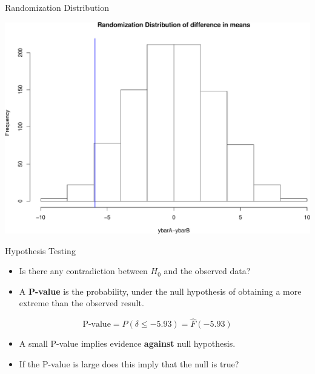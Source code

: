 \documentclass[9pt,ignorenonframetext,]{beamer}
\providecommand{\tightlist}{%
\setlength{\itemsep}{0pt}\setlength{\parskip}{0pt}}
\begin{document}
\begin{frame}{Randomization Distribution}

\includegraphics{class4slides-jan18_files/figure-beamer/unnamed-chunk-7-1.pdf}

\end{frame}

\begin{frame}{Hypothesis Testing}

\begin{itemize}
\tightlist
\item
  Is there any contradiction between \(H_0\) and the observed data?
\item
  A \textbf{P-value} is the probability, under the null hypothesis of
  obtaining a more extreme than the observed result.
\end{itemize}

\[ \text{P-value}=P\left(\delta \le -5.93 \right)={\hat F}(-5.93)\]

\begin{itemize}
\item
  A small P-value implies evidence \textbf{against} null hypothesis.
\item
  If the P-value is large does this imply that the null is true?
\end{itemize}

\end{frame}
\end{document}

